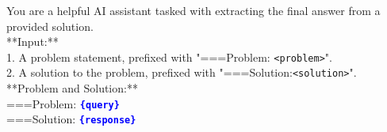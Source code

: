 \documentclass{article}
\theoremstyle{plain}
\theoremstyle{definition}
\theoremstyle{remark}
\begin{document}
\begin{table}[h]
\caption{Prompts for extract answer and answer evaluation.}
\label{tab:get_answer_prompt}
\begin{response}
You are a helpful AI assistant tasked with extracting the final answer from a provided solution. \\

**Input:** \\
1. A problem statement, prefixed with "===Problem:  \texttt{<problem>}".\\
2. A solution to the problem, prefixed with "===Solution:\texttt{<solution>}".\\

**Problem and Solution:** \\
===Problem: \textbf{\textcolor{blue}{\texttt{\{query\}}}}\\

===Solution: \textbf{\textcolor{blue}{\texttt{\{response\}}}}\\


\end{response}
\end{table}
\end{document}
